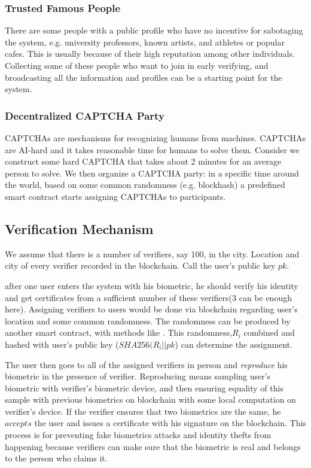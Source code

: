 \documentclass[conference]{IEEEtran}
\begin{document}
\subsubsection*{Trusted Famous People}
There are some people with a public profile who have no incentive for sabotaging the system, e.g. university professors, known artists, and athletes or popular cafes. This is usually because of their high reputation among other individuals. Collecting some of these people who want to join in early verifying, and broadcasting all the information and profiles can be a starting point for the system.

\subsubsection*{Decentralized CAPTCHA Party}
CAPTCHAs \cite{CAPTCHA} are mechanisms for recognizing humans from machines. CAPTCHAs are AI-hard and it takes reasonable time for humans to solve them. Consider we construct some hard CAPTCHA that takes about 2 minutes for an average person to solve. We then organize a CAPTCHA party: in a specific time around the world, based on some common randomness (e.g. blockhash) a predefined smart contract starts assigning CAPTCHAs to participants. 

\subsection{Verification Mechanism}
We assume that there is a number of verifiers, say 100, in the city. Location and city of every verifier recorded in the blockchain. Call the user's public key $pk$.


 after one user enters the system with his biometric, he should verify his identity and get certificates from a sufficient number of these verifiers(3 can be enough here). Assigning verifiers to users would be done via blockchain regarding user's location and some common randomness. The randomness can be produced by another smart contract, with methods like  \cite{rhound}. %
  This randomness,$ R_i$ combined and hashed with user's public key ($SHA256(R_i || pk$) can determine the assignment. 
 
 
The user then goes to all of the assigned verifiers in person and \textit{reproduce}  his biometric in the presence of verifier. Reproducing means sampling user's biometric with verifier's biometric device, and then ensuring equality of this sample with previous biometrics on blockchain with some local computation on verifier's device. If the verifier ensures that two biometrics are the same, he $accepts$ the user and issues a certificate with his signature on the blockchain. This process is for preventing fake biometrics attacks and identity thefts from happening because verifiers can make sure that the biometric is real and belongs to the person who claims it. 
\end{document}
